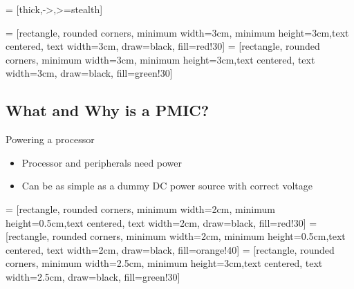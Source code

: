 \documentclass[10pt]{beamer}
\begin{document}

 = [thick,->,>=stealth]

 = [rectangle, rounded corners, minimum width=3cm, minimum height=3cm,text centered, text width=3cm, draw=black, fill=red!30]
 = [rectangle, rounded corners, minimum width=3cm, minimum height=3cm,text centered, text width=3cm, draw=black, fill=green!30]

\addtocounter{framenumber}{-1}
\begin{frame}[plain]
\section{What and Why is a PMIC?}
\end{frame}

\begin{frame}[t]{Powering a processor}\vspace{4pt}
\begin{itemize}
	\item Processor and peripherals need power
	\item Can be as simple as a dummy DC power source with correct voltage
\end{itemize}


\vfill
\centering
\begin{minipage}[c]{.75\textwidth}

\end{minipage}
\end{frame}


 = [rectangle, rounded corners, minimum width=2cm, minimum height=0.5cm,text centered, text width=2cm, draw=black, fill=red!30]
 = [rectangle, rounded corners, minimum width=2cm, minimum height=0.5cm,text centered, text width=2cm, draw=black, fill=orange!40]
 = [rectangle, rounded corners, minimum width=2.5cm, minimum height=3cm,text centered, text width=2.5cm, draw=black, fill=green!30]
\end{document}
